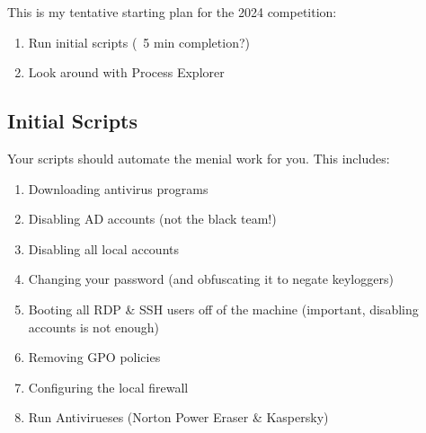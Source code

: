\documentclass{article}
\begin{document}
This is my tentative starting plan for the 2024 competition:
\begin{enumerate}
        \item Run initial scripts (~5 min completion?)
        \item Look around with Process Explorer
\end{enumerate}

\subsection{Initial Scripts}
Your scripts should automate the menial work for you. This includes:
\begin{enumerate}
        \item Downloading antivirus programs
        \item Disabling AD accounts (not the black team!)
        \item Disabling all local accounts
        \item Changing your password (and obfuscating it to negate keyloggers)
        \item Booting all RDP \& SSH users off of the machine (important, disabling accounts is not enough)
        \item Removing GPO policies
        \item Configuring the local firewall
        \item Run Antivirueses (Norton Power Eraser \& Kaspersky)
\end{enumerate}
\end{document}
